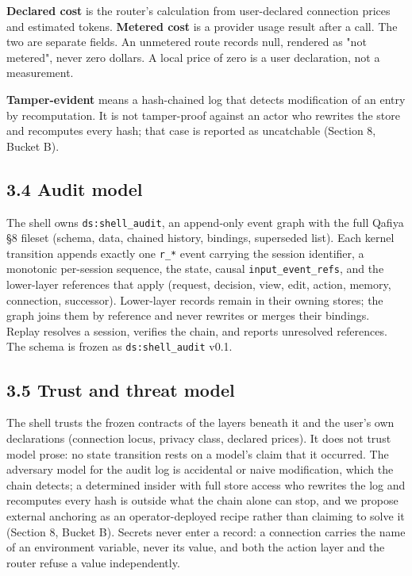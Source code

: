 \documentclass[11pt,a4paper]{article}
\begin{document}
\textbf{Declared cost} is the router's calculation from user-declared connection prices and estimated tokens. \textbf{Metered cost} is a provider usage result after a call. The two are separate fields. An unmetered route records null, rendered as "not metered", never zero dollars. A local price of zero is a user declaration, not a measurement.

\textbf{Tamper-evident} means a hash-chained log that detects modification of an entry by recomputation. It is not tamper-proof against an actor who rewrites the store and recomputes every hash; that case is reported as uncatchable (Section 8, Bucket B).

\subsection*{3.4 Audit model}
The shell owns \texttt{ds:shell\_audit}, an append-only event graph with the full Qafiya \S{}8 fileset (schema, data, chained history, bindings, superseded list). Each kernel transition appends exactly one \texttt{r\_*} event carrying the session identifier, a monotonic per-session sequence, the state, causal \texttt{input\_event\_refs}, and the lower-layer references that apply (request, decision, view, edit, action, memory, connection, successor). Lower-layer records remain in their owning stores; the graph joins them by reference and never rewrites or merges their bindings. Replay resolves a session, verifies the chain, and reports unresolved references. The schema is frozen as \texttt{ds:shell\_audit} v0.1.

\subsection*{3.5 Trust and threat model}
The shell trusts the frozen contracts of the layers beneath it and the user's own declarations (connection locus, privacy class, declared prices). It does not trust model prose: no state transition rests on a model's claim that it occurred. The adversary model for the audit log is accidental or naive modification, which the chain detects; a determined insider with full store access who rewrites the log and recomputes every hash is outside what the chain alone can stop, and we propose external anchoring as an operator-deployed recipe rather than claiming to solve it (Section 8, Bucket B). Secrets never enter a record: a connection carries the name of an environment variable, never its value, and both the action layer and the router refuse a value independently.
\end{document}
